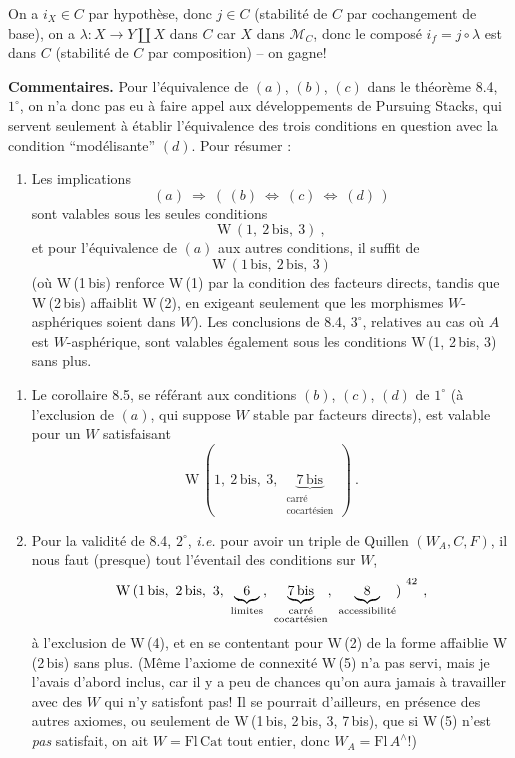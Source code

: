 \documentclass[11pt]{article}
\newcommand{\printedpage}[1]{\marginpar{\footnotesize p.~#1}}
\newcommand{\msp}[1]{\marginpar{\footnotesize [#1]}}
\begin{document}
\msp{page 114}

On a $i_X \in C$ par hypothèse, donc $j \in C$ (stabilité de $C$ par cochangement de base), on a $\lambda : X \longrightarrow Y \amalg X$ dans $C$ car $X$ dans $\mathcal{M}_C$, donc le composé $i_f = j \circ \lambda$ est dans $C$ (stabilité de $C$ par composition) – on gagne!

\textbf{Commentaires.} Pour l'équivalence de $(a)$, $(b)$, $(c)$ dans le théorème 8.4, $1^\circ$, on n'a donc pas eu à faire appel aux développements de Pursuing Stacks, qui servent seulement à établir l'équivalence des trois conditions en question avec la condition “modélisante” $(d)$. Pour résumer :
\begin{enumerate}[leftmargin=2.5em]
\item[$1^\circ$)] Les implications
\[
(a) \ \Longrightarrow\ (\,(b) \ \Longleftrightarrow\ (c) \ \Longleftrightarrow\ (d)\,)
\]
sont valables sous les seules conditions
\[
\mathrm{W}\,(1,\ 2\,\mathrm{bis},\ 3)\ ,
\]
et pour l'équivalence de $(a)$ aux autres conditions, il suffit de
\[
\mathrm{W}\,(1\,\mathrm{bis},\ 2\,\mathrm{bis},\ 3)
\]
(où W\,(1\,bis) renforce W\,(1) par la condition des facteurs directs, tandis que W\,(2\,bis) affaiblit W\,(2), en exigeant seulement que les morphismes $W$-asphériques soient dans $W$). Les conclusions de 8.4, $3^\circ$, relatives au cas où $A$ est $W$-asphérique, sont valables également sous les conditions W\,(1, 2\,bis, 3) sans plus.
\end{enumerate}

\msp{page 115}

\begin{enumerate}[leftmargin=2.5em]
\item[$2^\circ$)] Le corollaire 8.5, se référant aux conditions $(b)$, $(c)$, $(d)$ de $1^\circ$ (à l'exclusion de $(a)$, qui suppose $W$ stable par facteurs directs), est valable pour un $W$ satisfaisant
\[
\mathrm{W}\,(1,\ 2\,\mathrm{bis},\ 3,\ \underbrace{7\,\mathrm{bis}}_{\substack{\text{carré}\\ \text{cocartésien}}}\,)\ .
\]
\printedpage{63}
\item[$3^\circ$)] Pour la validité de 8.4, $2^\circ$, \textit{i.e.} pour avoir un triple de Quillen $(W_A,C,F)$, il nous faut (presque) tout l'éventail des conditions sur $W$,
\[
\mathrm{W}\,(1\,\mathrm{bis},\ 2\,\mathrm{bis},\ 3,\ \underbrace{\ 6\ }_{\text{limites}},\ \underbrace{7\,\mathrm{bis}}_{\substack{\text{carré}\\ \text{cocartésien}}},\ \underbrace{\ 8\ }_{\text{accessibilité}})\ ^{\footnotemark[42]}\ ,
\]
à l'exclusion de W\,(4), et en se contentant pour W\,(2) de la forme affaiblie W\,(2\,bis) sans plus. (Même l'axiome de connexité W\,(5) n'a pas servi, mais je l'avais d'abord inclus, car il y a peu de chances qu'on aura jamais à travailler avec des $W$ qui n'y satisfont pas! Il se pourrait d'ailleurs, en présence des autres axiomes, ou seulement de W\,(1\,bis, 2\,bis, 3, 7\,bis), que si W\,(5) n'est \textit{pas} satisfait, on ait $W = \mathrm{Fl}\,\mathrm{Cat}$ tout entier, donc $W_A = \mathrm{Fl}\,A^\wedge$!)
\end{enumerate}
\end{document}
